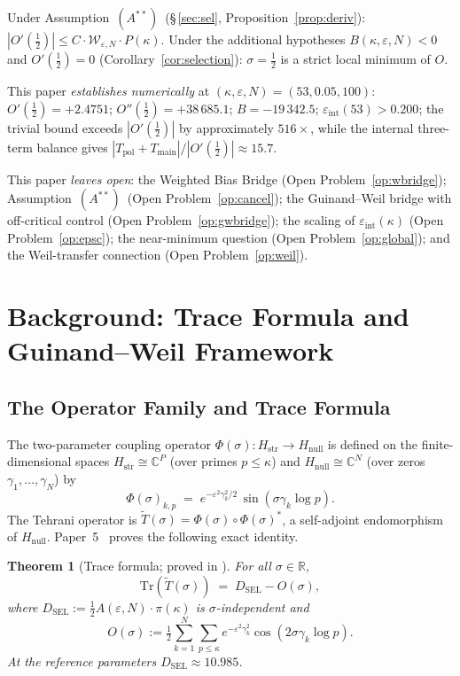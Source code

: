 \documentclass[11pt]{article}
\newtheorem{theorem}{Theorem}[section]
\newcommand{\Hstr}{H_{\mathrm{str}}}
\newcommand{\Hnull}{H_{\mathrm{null}}}
\newcommand{\Tt}{\widetilde{T}}
\newcommand{\DSEL}{D_{\mathrm{SEL}}}
\newcommand{\Wgamma}{\mathcal{W}_{\varepsilon,N}}   %
\newcommand{\Astar}{\ensuremath{(A^{**})}}  %
\begin{document}
Under Assumption~\Astar\
(\S\,\ref{sec:sel}, Proposition~\ref{prop:deriv}):
$|O'(\tfrac12)|\le C\cdot\Wgamma\cdot P(\kappa)$.
Under the additional hypotheses $B(\kappa,\varepsilon,N)<0$ and
$O'(\tfrac12)=0$ (Corollary~\ref{cor:selection}):
$\sigma=\tfrac12$ is a strict local minimum of $O$.

This paper \emph{establishes numerically} at
$(\kappa,\varepsilon,N)=(53,0.05,100)$:
$O'(\tfrac12)=+2.4751$; $O''(\tfrac12)=+38\,685.1$; $B=-19\,342.5$;
$\varepsilon_{\mathrm{int}}(53)>0.200$;
the trivial bound exceeds $|O'(\tfrac12)|$ by approximately $516\times$,
while the internal three-term balance gives
$|T_{\mathrm{pol}}+T_{\mathrm{main}}|/|O'(\tfrac12)|\approx 15.7$.

This paper \emph{leaves open}:
the Weighted Bias Bridge (Open Problem~\ref{op:wbridge});
Assumption~\Astar\ (Open Problem~\ref{op:cancel});
the Guinand--Weil bridge with off-critical control (Open Problem~\ref{op:gwbridge});
the scaling of $\varepsilon_{\mathrm{int}}(\kappa)$ (Open Problem~\ref{op:epsc});
the near-minimum question (Open Problem~\ref{op:global});
and the Weil-transfer connection (Open Problem~\ref{op:weil}).

\section{Background: Trace Formula and Guinand--Weil Framework}
\label{sec:bg}

\subsection{The Operator Family and Trace Formula}

The two-parameter coupling operator $\Phi(\sigma):\Hstr\to\Hnull$
is defined on the finite-dimensional spaces $\Hstr\cong\mathbb{C}^P$
(over primes $p\le\kappa$) and $\Hnull\cong\mathbb{C}^N$
(over zeros $\gamma_1,\ldots,\gamma_N$) by
\[
\Phi(\sigma)_{k,p} \;=\; e^{-\varepsilon^2\gamma_k^2/2}\,\sin(\sigma\gamma_k\log p).
\]
The Tehrani operator is $\Tt(\sigma)=\Phi(\sigma)\circ\Phi(\sigma)^*$,
a self-adjoint endomorphism of $\Hnull$.
Paper~5~\cite{Paper5} proves the following exact identity.

\begin{theorem}[Trace formula; proved in \cite{Paper5}]
\label{thm:trace}
For all $\sigma\in\mathbb{R}$,
\[
\mathrm{Tr}(\Tt(\sigma)) \;=\; \DSEL - O(\sigma),
\]
where $\DSEL:=\tfrac12 A(\varepsilon,N)\cdot\pi(\kappa)$ is
$\sigma$-independent and
\[
O(\sigma):=\tfrac12\sum_{k=1}^N\sum_{p\le\kappa}
e^{-\varepsilon^2\gamma_k^2}\cos(2\sigma\gamma_k\log p).
\]
At the reference parameters $\DSEL\approx 10.985$.
\end{theorem}
\end{document}
